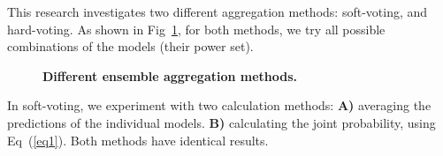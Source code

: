 \documentclass[10pt,letterpaper]{article}
\begin{document}
\begin{table}[!ht]
\begin{adjustwidth}{-1.0in}{0in} %
  \centering
  \caption{
    {\bf The r@k metrics for the networks used to construct the  ensemble model.}}
  \label{table4}
  \end{adjustwidth}
\end{table}

This research investigates two different aggregation methods: soft-voting, and hard-voting. As shown in Fig~\ref{fig1}, for both methods, we try all possible  combinations of the models (their power set).

\begin{figure}[!h]
\caption{{\bf Different ensemble aggregation methods.}}
\label{fig1}
\end{figure}

In soft-voting, we experiment with two calculation methods: {\bf A)} averaging the predictions of the individual models. {\bf B)} calculating the joint probability, using Eq~(\ref{eq1}). Both methods have identical results.
\end{document}
